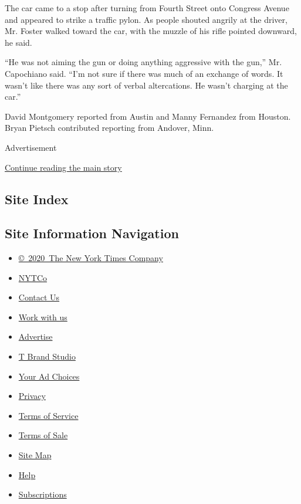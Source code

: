 The car came to a stop after turning from Fourth Street onto Congress
Avenue and appeared to strike a traffic pylon. As people shouted angrily
at the driver, Mr. Foster walked toward the car, with the muzzle of his
rifle pointed downward, he said.

``He was not aiming the gun or doing anything aggressive with the gun,''
Mr. Capochiano said. ``I'm not sure if there was much of an exchange of
words. It wasn't like there was any sort of verbal altercations. He
wasn't charging at the car.''

David Montgomery reported from Austin and Manny Fernandez from Houston.
Bryan Pietsch contributed reporting from Andover, Minn.

Advertisement

\protect\hyperlink{after-bottom}{Continue reading the main story}

\hypertarget{site-index}{%
\subsection{Site Index}\label{site-index}}

\hypertarget{site-information-navigation}{%
\subsection{Site Information
Navigation}\label{site-information-navigation}}

\begin{itemize}
\tightlist
\item
  \href{https://help.nytimes.com/hc/en-us/articles/115014792127-Copyright-notice}{©~2020~The
  New York Times Company}
\end{itemize}

\begin{itemize}
\tightlist
\item
  \href{https://www.nytco.com/}{NYTCo}
\item
  \href{https://help.nytimes.com/hc/en-us/articles/115015385887-Contact-Us}{Contact
  Us}
\item
  \href{https://www.nytco.com/careers/}{Work with us}
\item
  \href{https://nytmediakit.com/}{Advertise}
\item
  \href{http://www.tbrandstudio.com/}{T Brand Studio}
\item
  \href{https://www.nytimes.com/privacy/cookie-policy\#how-do-i-manage-trackers}{Your
  Ad Choices}
\item
  \href{https://www.nytimes.com/privacy}{Privacy}
\item
  \href{https://help.nytimes.com/hc/en-us/articles/115014893428-Terms-of-service}{Terms
  of Service}
\item
  \href{https://help.nytimes.com/hc/en-us/articles/115014893968-Terms-of-sale}{Terms
  of Sale}
\item
  \href{https://spiderbites.nytimes.com}{Site Map}
\item
  \href{https://help.nytimes.com/hc/en-us}{Help}
\item
  \href{https://www.nytimes.com/subscription?campaignId=37WXW}{Subscriptions}
\end{itemize}
